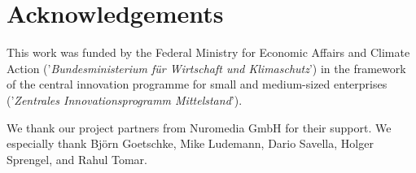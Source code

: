 \documentclass[runningheads]{llncs}
\begin{document}
\section*{Acknowledgements}

This work was funded by the Federal Ministry for Economic Affairs and Climate Action
('\textsl{Bundesministerium f\"ur Wirtschaft und Klimaschutz}')
in the framework of the central innovation programme
for small and medium-sized enterprises
('\textsl{Zentrales Innovationsprogramm Mittelstand}').

We thank our project partners from Nuromedia GmbH for their support.
We especially thank Björn Goetschke, Mike Ludemann, Dario Savella, Holger Sprengel, and Rahul Tomar.



%
%


%

\end{document}
